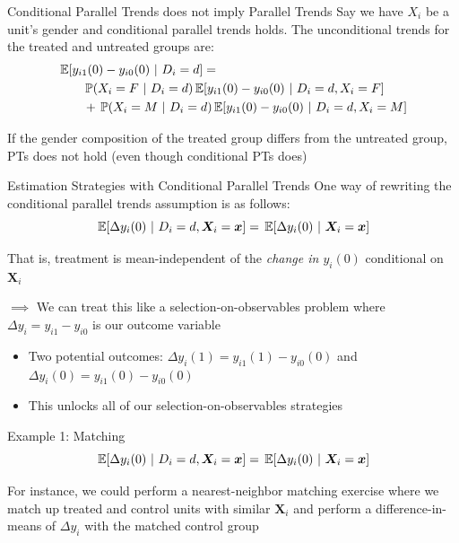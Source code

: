 \documentclass[aspectratio=169,t,11pt,table]{beamer}
\begin{document}
\begin{frame}{Conditional Parallel Trends does not imply Parallel Trends}
  Say we have $X_i$ be a unit's gender and conditional parallel trends holds. The unconditional trends for the treated and untreated groups are:
  \begin{align*}
    &\expec{y_{i1}(0) - y_{i0}(0)}{D_i = d} =\\
    &\quad\quad \prob{X_i = F}{D_i = d} \expec{y_{i1}(0) - y_{i0}(0)}{D_i = d, X_i = F} \\
    &\quad\quad+ \prob{X_i = M}{D_i = d} \expec{y_{i1}(0) - y_{i0}(0)}{D_i = d, X_i = M} 
  \end{align*}

  \pause
  \bigskip
  If the gender composition of the treated group differs from the untreated group, PTs does not hold (even though conditional PTs does)
\end{frame}

\begin{frame}{Estimation Strategies with Conditional Parallel Trends}
  One way of rewriting the conditional parallel trends assumption is as follows:
  $$
    \expec{\Delta y_i(0)}{D_i = d, \bm{X}_i = \bm{x}} = \expec{\Delta y_i(0)}{\bm{X}_i = \bm{x}}
  $$

  That is, treatment is mean-independent of the \emph{change in $y_i(0)$} conditional on $\bm{X}_i$
  
  \pause
  \bigskip
  $\implies$ We can treat this like a selection-on-observables problem where $\Delta y_i = y_{i1} - y_{i0}$ is our outcome variable
  \begin{itemize}
    \item Two potential outcomes: $\Delta y_i(1) = y_{i1}(1) - y_{i0}(0)$ and $\Delta y_i(0) = y_{i1}(0) - y_{i0}(0)$
    \item This unlocks all of our selection-on-observables strategies
  \end{itemize}
\end{frame}

\begin{frame}{Example 1: Matching}
  \vspace*{-\bigskipamount}
  $$
    \expec{\Delta y_i(0)}{D_i = d, \bm{X}_i = \bm{x}} = \expec{\Delta y_i(0)}{\bm{X}_i = \bm{x}}
  $$

  \bigskip
  For instance, we could perform a nearest-neighbor matching exercise where we match up treated and control units with similar $\bm{X}_i$ and perform a difference-in-means of $\Delta y_i$ with the matched control group
\end{frame}
\end{document}
